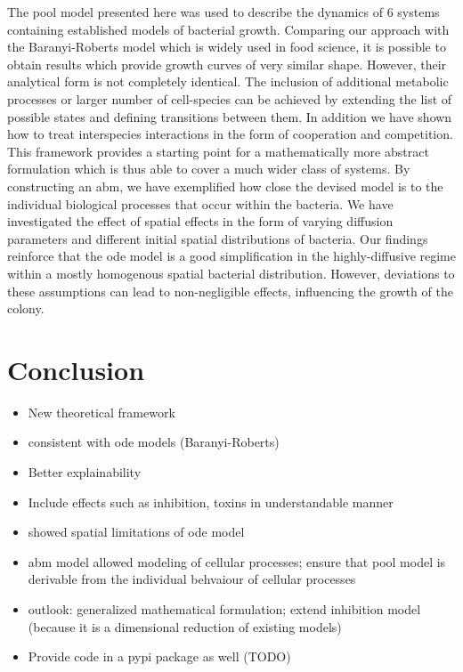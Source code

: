 \documentclass[10pt,A4paper]{article}
\numberwithin{equation}{section}
\begin{document}
The pool model presented here was used to describe the dynamics of 6 systems containing established models of bacterial growth.
Comparing our approach with the Baranyi-Roberts model which is widely used in food science, it is possible to obtain results which provide growth curves of very similar shape.
However, their analytical form is not completely identical.
The inclusion of additional metabolic processes or larger number of cell-species can be achieved by extending the list of possible states and defining transitions between them.
In addition we have shown how to treat interspecies interactions in the form of cooperation and competition.
This framework provides a starting point for a mathematically more abstract formulation which is thus able to cover a much wider class of systems.
By constructing an \ac{abm}, we have exemplified how close the devised model is to the individual biological processes that occur within the bacteria.
We have investigated the effect of spatial effects in the form of varying diffusion parameters and different initial spatial distributions of bacteria.
Our findings reinforce that the \ac{ode} model is a good simplification in the highly-diffusive regime within a mostly homogenous spatial bacterial distribution.
However, deviations to these assumptions can lead to non-negligible effects, influencing the growth of the colony.

\section{Conclusion}
\begin{itemize}
    \item New theoretical framework
    \item consistent with \ac{ode} models (Baranyi-Roberts)
    \item Better explainability
    \item Include effects such as inhibition, toxins in understandable manner
    \item showed spatial limitations of \ac{ode} model
    \item \ac{abm} model allowed modeling of cellular processes; ensure that pool model is derivable
        from the individual behvaiour of cellular processes
    \item outlook: generalized mathematical formulation; extend inhibition model (because it is a
        dimensional reduction of existing models)
    \item Provide code in a pypi package as well (TODO)
\end{itemize}
\end{document}
